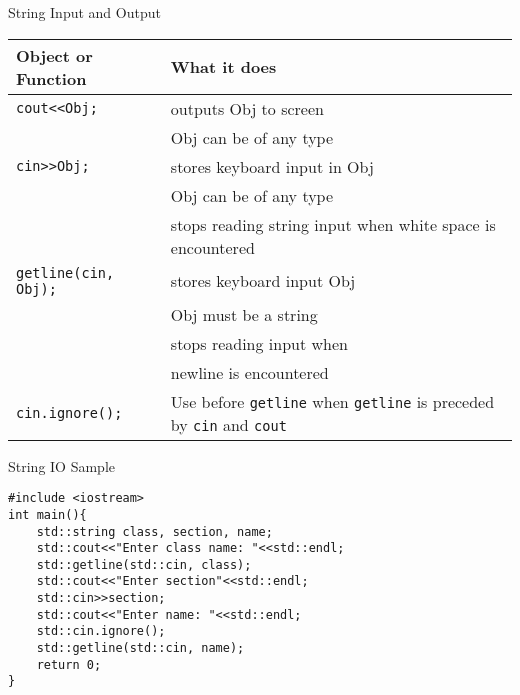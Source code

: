 \documentclass[xcolor={dvipsnames}]{beamer}
\begin{document}
\begin{frame}{String Input and Output}
	\begin{tabularx}{\textwidth}{| l | X |}
		\hline
		\textbf{Object or Function} & \textbf{What it does}\\
		\hline
		\texttt{cout<<Obj;}& outputs Obj to screen\\
					      & Obj can be of any type\\
		\hline
		\texttt{cin>>Obj;} & stores keyboard input in Obj \\
					    & Obj can be of any type\\
				 	    & stops reading string input when white space is encountered\\
		\hline
		\texttt{getline(cin, Obj);} & stores keyboard input Obj\\
							& Obj must be a string\\
							    & stops reading input when\\
							    & newline is encountered\\
							   
		\hline
		\texttt{cin.ignore();} & Use before \texttt{getline} when  \texttt{getline} is preceded by \texttt{cin} and \texttt{cout}\\
\hline
	\end{tabularx}
\end{frame}

\begin{frame}[fragile]{String IO Sample}
\begin{verbatim}
#include <iostream>
int main(){
	std::string class, section, name; 
	std::cout<<"Enter class name: "<<std::endl;
	std::getline(std::cin, class);
	std::cout<<"Enter section"<<std::endl;
	std::cin>>section;
	std::cout<<"Enter name: "<<std::endl;
	std::cin.ignore();
	std::getline(std::cin, name);
	return 0;
}
\end{verbatim}
\end{frame}
\end{document}
